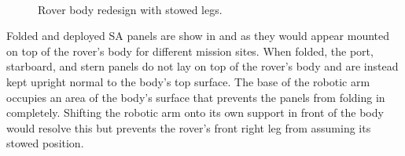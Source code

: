 \begin{figure}[h]
\begin{subfigure}[t]{\subfigureWidth}
		\label{fig:sub:rover-body-redesign-stowed-legs-after}
	\end{subfigure}\\[0.8ex]
    \caption[Rover body redesign with stowed legs]
            {Rover body redesign with stowed legs.}
    \label{fig:rover-body-redesign-stowed-legs}
\vspace{-2ex}
\end{figure}


Folded and deployed \ac{SA} panels are show in  and  as they would appear mounted on top of the rover's body for different mission sites. When folded, the port, starboard, and stern panels do not lay on top of the rover's body and are instead kept upright normal to the body's top surface. The base of the robotic arm occupies an area of the body's surface that prevents the panels from folding in completely. Shifting the robotic arm onto its own support in front of the body would resolve this but prevents the rover's front right leg from assuming its stowed position.

\vspace{0.5cm}

